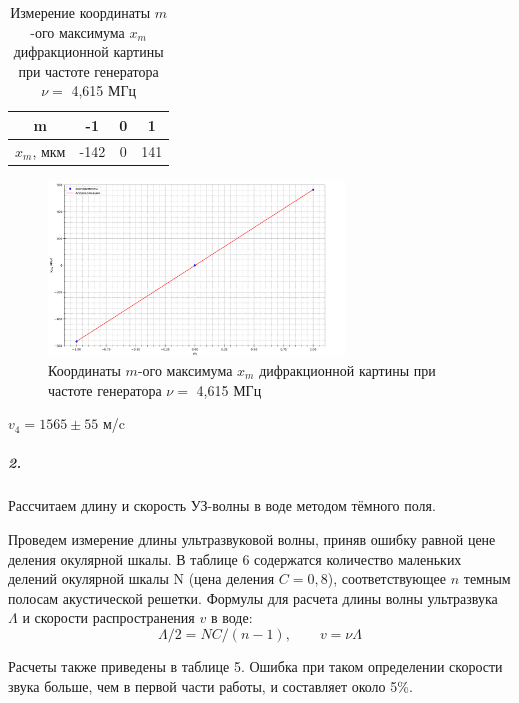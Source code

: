 \documentclass[a4paper,12pt]{article}
\begin{document}
\begin{table}[!h]
\begin{center}
\begin{tabular}{|c|c|c|c|}
\hline
     m & -1 & 0 & 1 \\ \hline
     $x_m$, мкм & -142 & 0 & 141  \\ \hline
\end{tabular}
\end{center}
\caption{Измерение координаты $ m $-ого максимума $ x_m $ дифракционной картины при частоте генератора $ \nu = $ 4,615 МГц}
\end{table}
\begin{figure}[!h]
		\centering	
		\includegraphics[width=0.7\textwidth]{graph4.png}
		\caption{Координаты $ m $-ого максимума $ x_m $ дифракционной картины при частоте генератора $ \nu = $ 4,615 МГц}
		\label{diff}
	\end{figure}
\begin{center}
    $v_4= 1565\pm 55$ м/c
\end{center}
\newpage 
\subparagraph{2.} Рассчитаем длину и скорость УЗ-волны в воде методом тёмного поля.\par
Проведем измерение длины ультразвуковой волны, приняв ошибку равной цене деления окулярной шкалы. В таблице 6 содержатся количество маленьких делений окулярной шкалы N (цена деления $ C = 0,8 $), соответствующее $ n $ темным полосам акустической решетки.
Формулы для расчета длины волны ультразвука $ \Lambda $ и скорости распространения $ v $ в воде:
\begin{equation}\label{}
\Lambda/2  = NC/(n - 1),  \qquad v = \nu\Lambda
\end{equation}

Расчеты также приведены в таблице 5. Ошибка при таком определении скорости звука больше, чем в первой части работы, и
составляет около 5\%.
\end{document}
